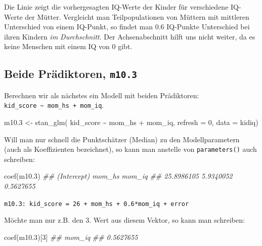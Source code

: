 \documentclass[
  a4paper,
  DIV=11]{scrreprt}
\newenvironment{Shaded}{\begin{snugshade}}{\end{snugshade}}
\newcommand{\AttributeTok}[1]{\textcolor[rgb]{0.40,0.45,0.13}{#1}}
\newcommand{\DecValTok}[1]{\textcolor[rgb]{0.68,0.00,0.00}{#1}}
\newcommand{\DocumentationTok}[1]{\textcolor[rgb]{0.37,0.37,0.37}{\textit{#1}}}
\newcommand{\FloatTok}[1]{\textcolor[rgb]{0.68,0.00,0.00}{#1}}
\newcommand{\FunctionTok}[1]{\textcolor[rgb]{0.28,0.35,0.67}{#1}}
\newcommand{\NormalTok}[1]{\textcolor[rgb]{0.00,0.23,0.31}{#1}}
\newcommand{\OtherTok}[1]{\textcolor[rgb]{0.00,0.23,0.31}{#1}}
\newcommand{\SpecialCharTok}[1]{\textcolor[rgb]{0.37,0.37,0.37}{#1}}
\theoremstyle{definition}
\theoremstyle{remark}
\begin{document}
Die Linie zeigt die vorhergesagten IQ-Werte der Kinder für verschiedene
IQ-Werte der Mütter. Vergleicht man Teilpopulationen von Müttern mit
mittleren Unterschied von einem IQ-Punkt, so findet man 0.6 IQ-Punkte
Unterschied bei ihren Kindern \emph{im Durchschnitt}. Der
Achsenabschnitt hilft uns nicht weiter, da es keine Menschen mit einem
IQ von 0 gibt.

\hypertarget{beide-pruxe4diktoren-m10.3}{%
\subsection{\texorpdfstring{Beide Prädiktoren,
\texttt{m10.3}}{Beide Prädiktoren, m10.3}}\label{beide-pruxe4diktoren-m10.3}}

Berechnen wir als nächstes ein Modell mit beiden Prädiktoren:
\texttt{kid\_score\ \textasciitilde{}\ mom\_hs\ +\ mom\_iq}.

\begin{Shaded}
\begin{Highlighting}[]
\NormalTok{m10}\FloatTok{.3} \OtherTok{\textless{}{-}} 
  \FunctionTok{stan\_glm}\NormalTok{(}
\NormalTok{    kid\_score }\SpecialCharTok{\textasciitilde{}}\NormalTok{ mom\_hs }\SpecialCharTok{+}\NormalTok{ mom\_iq, }
    \AttributeTok{refresh =} \DecValTok{0}\NormalTok{,}
    \AttributeTok{data =}\NormalTok{ kidiq)}
\end{Highlighting}
\end{Shaded}

Will man nur schnell die Punktschätzer (Median) zu den Modellparametern
(auch als Koeffizienten bezeichnet), so kann man anstelle von
\texttt{parameters()} auch schreiben:

\begin{Shaded}
\begin{Highlighting}[]
\FunctionTok{coef}\NormalTok{(m10}\FloatTok{.3}\NormalTok{)}
\DocumentationTok{\#\# (Intercept)      mom\_hs      mom\_iq }
\DocumentationTok{\#\#  25.8986105   5.9340052   0.5627655}
\end{Highlighting}
\end{Shaded}

\texttt{m10.3:\ kid\_score\ =\ 26\ +\ mom\_hs\ +\ 0.6*mom\_iq\ +\ error}

Möchte man nur z.B. den 3. Wert aus diesem Vektor, so kann man
schreiben:

\begin{Shaded}
\begin{Highlighting}[]
\FunctionTok{coef}\NormalTok{(m10}\FloatTok{.3}\NormalTok{)[}\DecValTok{3}\NormalTok{]}
\DocumentationTok{\#\#    mom\_iq }
\DocumentationTok{\#\# 0.5627655}
\end{Highlighting}
\end{Shaded}
\end{document}
